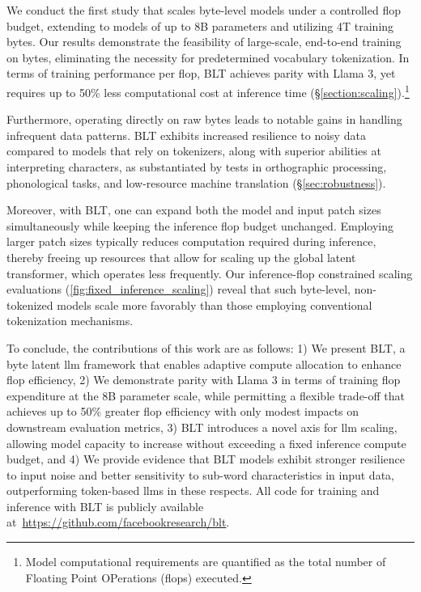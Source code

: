We conduct the first study that scales byte-level models under a controlled flop budget, extending to models of up to 8B parameters and utilizing 4T training bytes. Our results demonstrate the feasibility of large-scale, end-to-end training on bytes, eliminating the necessity for predetermined vocabulary tokenization. In terms of training performance per flop, {\textsc BLT} achieves parity with Llama 3, yet requires up to 50\% less computational cost at inference time (\S\ref{section:scaling}).\footnote{Model computational requirements are quantified as the total number of Floating Point OPerations (flops) executed.} 

Furthermore, operating directly on raw bytes leads to notable gains in handling infrequent data patterns. {\textsc BLT} exhibits increased resilience to noisy data compared to models that rely on tokenizers, along with superior abilities at interpreting characters, as substantiated by tests in orthographic processing, phonological tasks, and low-resource machine translation (\S\ref{sec:robustness}). 

Moreover, with {\textsc BLT}, one can expand both the model and input patch sizes simultaneously while keeping the inference flop budget unchanged. Employing larger patch sizes typically reduces computation required during inference, thereby freeing up resources that allow for scaling up the global latent transformer, which operates less frequently. Our inference-flop constrained scaling evaluations (\autoref{fig:fixed_inference_scaling}) reveal that such byte-level, non-tokenized models scale more favorably than those employing conventional tokenization mechanisms.

To conclude, the contributions of this work are as follows: 1) We present {\textsc BLT}, a byte latent llm framework that enables adaptive compute allocation to enhance flop efficiency, 2) We demonstrate parity with Llama 3 in terms of training flop expenditure at the 8B parameter scale, while permitting a flexible trade-off that achieves up to 50\% greater flop efficiency with only modest impacts on downstream evaluation metrics, 3) {\textsc BLT} introduces a novel axis for llm scaling, allowing model capacity to increase without exceeding a fixed inference compute budget, and 4) We provide evidence that {\textsc BLT} models exhibit stronger resilience to input noise and better sensitivity to sub-word characteristics in input data, outperforming token-based llms in these respects. All code for training and inference with {\textsc BLT} is publicly available at~\url{https://github.com/facebookresearch/blt}.

